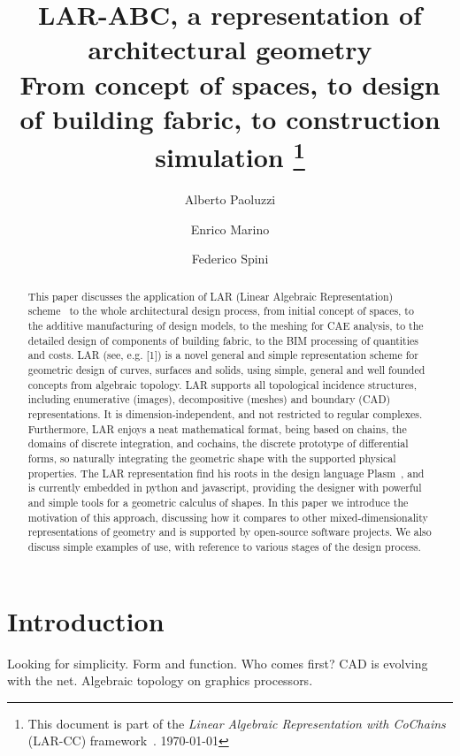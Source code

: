 \documentclass[11pt,oneside]{article}    %
\title{LAR-ABC, a representation of architectural geometry \\
{\Large From concept of spaces, to design of building fabric, to construction simulation}
\footnote{This document is part of the \emph{Linear Algebraic Representation with CoChains} (LAR-CC) framework~\cite{cclar-proj:2013:00}. \today}
}
\author{Alberto Paoluzzi \and Enrico Marino \and Federico Spini}
\begin{document}
\maketitle

\begin{abstract}
This paper discusses the application of LAR (Linear Algebraic Representation) scheme~\cite{Dicarlo:2014:TNL:2543138.2543294} to the whole architectural design process, from initial concept of spaces, to the additive manufacturing of design models, to the meshing for CAE analysis, to the detailed design of components of building fabric, to the BIM processing of quantities and costs. LAR (see, e.g. [1]) is a novel general and simple representation scheme for geometric design of curves, surfaces and solids, using simple, general and well founded concepts from algebraic topology. 
LAR supports all topological incidence structures, including enumerative (images), decompositive (meshes) and boundary (CAD) representations. It is dimension-independent, and not restricted to regular complexes. Furthermore, LAR enjoys a neat mathematical format, being based on chains, the domains of discrete integration, and cochains, the discrete prototype of differential forms, so naturally integrating the geometric shape with the supported physical properties. 
The LAR representation find his roots in the design language Plasm~\cite{Paoluzzi2003a}, and is currently embedded in python and javascript, providing the designer with powerful and simple tools for a geometric calculus of shapes. In this paper we introduce the motivation of this approach, discussing how it compares to other mixed-dimensionality representations of geometry and is supported by open-source software projects. We also discuss simple examples of use, with reference to various stages of the design process.
\end{abstract}

\newpage
\tableofcontents
\newpage

\section{Introduction}\label{sec:intro}
Looking for simplicity. 
Form and function. Who comes first?
CAD is evolving with the net.
Algebraic topology on graphics processors.
\end{document}
